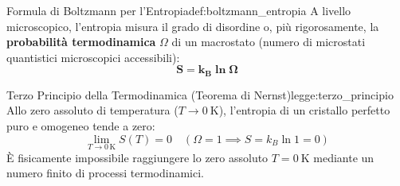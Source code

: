 \begin{definizione}{Formula di Boltzmann per l'Entropia}{def:boltzmann_entropia}
A livello microscopico, l'entropia misura il grado di disordine o, più rigorosamente, la \textbf{probabilità termodinamica} $\Omega$ di un macrostato (numero di microstati quantistici microscopici accessibili):
\begin{equation}
    \mathbf{S = k_B \ln\Omega}
    \label{eq:boltzmann_entropia}
\end{equation}
\end{definizione}

\begin{legge}{Terzo Principio della Termodinamica (Teorema di Nernst)}{legge:terzo_principio}
Allo zero assoluto di temperatura ($T \to \SI{0}{\kelvin}$), l'entropia di un cristallo perfetto puro e omogeneo tende a zero:
\begin{equation}
    \lim_{T \to 0\,\si{\kelvin}} S(T) = 0 \quad (\Omega = 1 \implies S = k_B \ln 1 = 0)
\end{equation}
È fisicamente impossibile raggiungere lo zero assoluto $T = \SI{0}{\kelvin}$ mediante un numero finito di processi termodinamici.
\end{legge}
